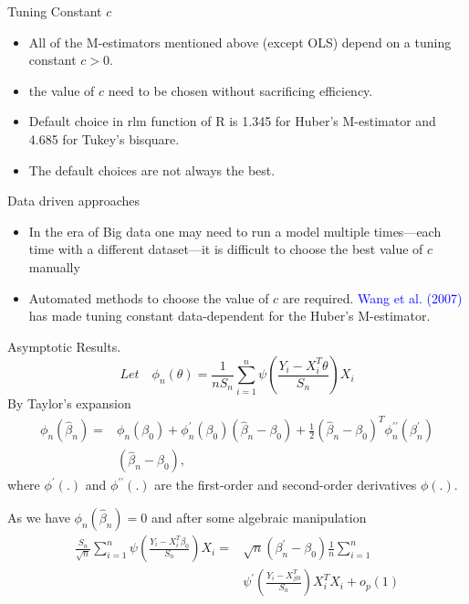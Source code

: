\documentclass[english,svgnames,notes=hide,14pt]{beamer}
\begin{document}
\begin{frame}{Tuning Constant $c$}
\begin{itemize}
\item All of the M-estimators mentioned above (except OLS) depend on a tuning constant $c > 0$.
\item the value of $c$ need to be chosen without sacrificing efficiency.
\item Default choice in rlm function of R is 1.345 for Huber's M-estimator and 4.685 for Tukey's bisquare.
\item The default choices are not always the best.
\end{itemize}
\end{frame}

\begin{frame}{Data driven approaches}
\begin{itemize}
    \item In the era of Big data one may need to run a model multiple times---each time with a different dataset---it is difficult to choose the best value of $c$ manually 
    \item Automated methods to choose the value of $c$ are required.
    \textcolor{blue}{Wang et al. (2007)} has made tuning constant data-dependent for the Huber's M-estimator.
\end{itemize}
\end{frame}

\begin{frame}{Asymptotic Results.}
$$
 Let \quad \phi_{n}(\theta) = \frac{1}{n S_{n}} \sum_{i=1}^{n} \psi (\frac{Y_{i} - X^{T}_{i}\theta}{S_{n}}) X_{i}
$$
 By Taylor's expansion
\begin{align*}
      \phi_{n}(\hat{\beta}_{n}) =& \phi_{n}(\beta_{0}) + \phi^{\prime}_{n}(\beta_{0})(\hat{\beta}_{n}- \beta_{0}) + \frac{1}{2}(\hat{\beta}_{n}- \beta_{0})^{T} \phi^{\prime \prime}_{n}(\beta_{n}^{\prime})\\  & (\hat{\beta}_{n}- \beta_{0}),
\end{align*}
where $\phi^{\prime}(.)$ and $\phi^{\prime \prime} (.)$ are the first-order and second-order derivatives $\phi(.)$.
\end{frame}

\begin{frame}{}
 As we have $\phi_{n}(\hat{\beta}_{n}) = 0$ and after some algebraic manipulation
\begin{align*}
    \frac{S_{n}}{\sqrt{n} } \sum_{i=1}^{n} \psi (\frac{Y_{i} - X^T_{i}\beta_0}{S_{n}}) X_{i} = & \sqrt{n}(\beta^{\prime}_{n} - \beta_{0}) \frac{1}{ n} \sum_{i=1}^{n}\\ & \psi^{\prime} (\frac{Y_{i} - X^T_\beta_0}{S_{n}}) X^{T}_{i} X_{i} + o_{p}(1)
\end{align*}
\end{frame}
\end{document}
